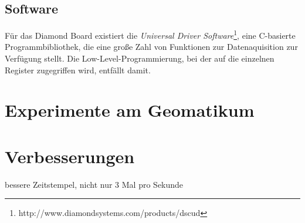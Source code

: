 \documentclass[12pt,a4paper]{scrartcl}
\begin{document}
\subsection{Software}

Für das Diamond Board existiert die \textit{Universal Driver Software}\footnote{http://www.diamondsystems.com/products/dscud}, eine C-basierte Programmbibliothek, die eine große Zahl von Funktionen zur Datenaquisition zur Verfügung stellt. Die Low-Level-Programmierung, bei der auf die einzelnen Register zugegriffen wird, entfällt damit. 



\section{Experimente am Geomatikum}


\section{Verbesserungen}

bessere Zeitstempel, nicht nur 3 Mal pro Sekunde

\clearpage
\newpage
\singlespacing
\appendix


\end{document}
